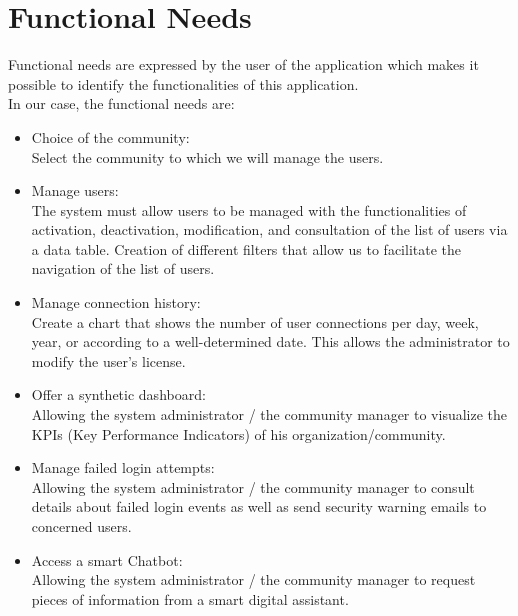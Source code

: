 \section{Functional Needs}
Functional needs are expressed by the user of the application
which makes it possible to identify the functionalities of this application.\\
In our
case, the functional needs are:
\begin{itemize}
\item Choice of the community:\\
Select the community to which we will manage the users.

\item Manage users:\\
The system must allow users to be managed with the functionalities of activation,
deactivation, modification, and consultation of the list of users via a data table.
Creation of different filters that allow us to facilitate the navigation of the list of users.

\item Manage connection history:\\
Create a chart that shows the number of user connections per day, week, year, or
according to a well-determined date. This allows the administrator to modify the user’s license.


\item Offer a synthetic dashboard:\\
Allowing the system administrator / the community manager to visualize the KPIs (Key Performance Indicators) of his organization/community.

\item Manage failed login attempts:\\
Allowing the system administrator / the community manager to consult details about failed login events as well as send security warning emails to concerned users.

\item Access a smart Chatbot:\\
Allowing the system administrator / the community manager to request pieces of information from a smart digital assistant.


\end{itemize}
